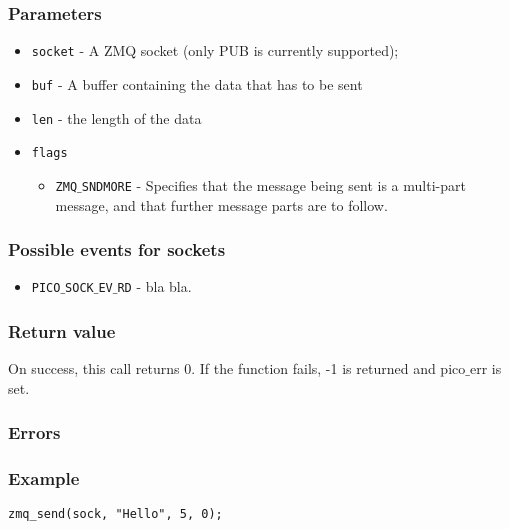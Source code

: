 \subsubsection*{Parameters}
\begin{itemize}[noitemsep]
\item \texttt{socket} - A ZMQ socket (only PUB is currently supported);
\item \texttt{buf} - A buffer containing the data that has to be sent
\item \texttt{len} - the length of the data
\item \texttt{flags}
\begin{itemize}[noitemsep]
\item \texttt{ZMQ$\_$SNDMORE} - Specifies that the message being sent is a multi-part message, and that further message parts are to follow.
\end{itemize}
\end{itemize}

\subsubsection*{Possible events for sockets}
\begin{itemize}[noitemsep]
\item \texttt{PICO$\_$SOCK$\_$EV$\_$RD} - bla bla.
\end{itemize}

\subsubsection*{Return value}
On success, this call returns 0. If the function fails, -1 is returned and pico$\_$err is set.

\subsubsection*{Errors}

\subsubsection*{Example}
\begin{verbatim}
zmq_send(sock, "Hello", 5, 0);
\end{verbatim}


